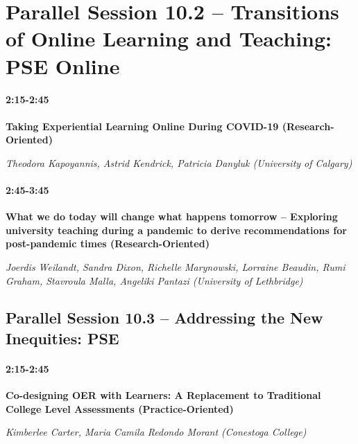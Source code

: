 \documentclass[
]{book}
\begin{document}
\hypertarget{parallel-session-10.2-transitions-of-online-learning-and-teaching-pse-online}{%
\section*{Parallel Session 10.2 -- Transitions of Online Learning and Teaching: PSE Online}\label{parallel-session-10.2-transitions-of-online-learning-and-teaching-pse-online}}

\begin{secondary}
\hypertarget{section}{%
\paragraph{2:15-2:45}\label{section}}

\textbf{Taking Experiential Learning Online During COVID-19
(Research-Oriented)}

\emph{Theodora Kapoyannis, Astrid Kendrick, Patricia Danyluk (University
of Calgary)}
\end{secondary}

\begin{secondary}
\hypertarget{section}{%
\paragraph{2:45-3:45}\label{section}}

\textbf{What we do today will change what happens tomorrow -- Exploring
university teaching during a pandemic to derive recommendations for
post-pandemic times (Research-Oriented)}

\emph{Joerdis Weilandt, Sandra Dixon, Richelle Marynowski, Lorraine
Beaudin, Rumi Graham, Stavroula Malla, Angeliki Pantazi (University of
Lethbridge)}
\end{secondary}

\hypertarget{parallel-session-10.3-addressing-the-new-inequities-pse}{%
\subsection*{Parallel Session 10.3 -- Addressing the New Inequities: PSE}\label{parallel-session-10.3-addressing-the-new-inequities-pse}}

\begin{secondary}
\hypertarget{section}{%
\paragraph{2:15-2:45}\label{section}}

\textbf{Co-designing OER with Learners: A Replacement to Traditional
College Level Assessments (Practice-Oriented)}

\emph{Kimberlee Carter, Maria Camila Redondo Morant (Conestoga College)}
\end{secondary}
\end{document}

